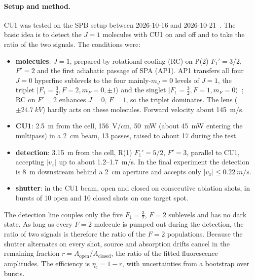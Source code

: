 \documentclass[11pt,a4paper,oneside]{report}
\newcommand{\etac}{\eta_{\mathrm{c}}}
\begin{document}
\paragraph{Setup and method.} CU1 was tested on the SPB setup between 2026-10-16 and
2026-10-21~\cite{CU1GroupMeeting2026}. The basic idea is to detect the $J=1$ molecules with CU1 on
and off and to take the ratio of the two signals. The conditions were:
\begin{itemize}[itemsep=1pt]
  \item \textbf{molecules}: $J=1$, prepared by rotational cooling (RC) on P(2) $F_1'=3/2$, $F'=2$ and
        the first adiabatic passage of SPA (AP1). AP1 transfers all four $J=0$ hyperfine sublevels
        to the four mainly-$m_J=0$ levels of $J=1$, the triplet
        $|F_1=\tfrac32,F=2,m_F=0,\pm1\rangle$ and the singlet
        $|F_1=\tfrac32,F=1,m_F=0\rangle$~\cite{Grasdijk2025AP}; RC on $F'=2$ enhances $J=0$, $F=1$,
        so the triplet dominates. The lens ($\pm\SI{24.7}{kV}$) hardly acts on these molecules.
        Forward velocity about \SI{145}{m/s}.
  \item \textbf{CU1}: \SI{2.5}{m} from the cell, \SI{156}{V/cm}, \SI{50}{mW} (about \SI{45}{mW}
        entering the multipass) in a \SI{2}{cm} beam, 13 passes, raised to about 17 during the test.
  \item \textbf{detection}: \SI{3.15}{m} from the cell, R(1) $F_1'=5/2$, $F'=3$, parallel to CU1,
        accepting $|v_x|$ up to about 1.2--\SI{1.7}{m/s}. In the final experiment the detection is
        \SI{8}{m} downstream behind a \SI{2}{cm} aperture and accepts only
        $|v_x|\leq\SI{0.22}{m/s}$.
  \item \textbf{shutter}: in the CU1 beam, open and closed on consecutive ablation shots, in bursts
        of 10 open and 10 closed shots on one target spot.
\end{itemize}
The detection line couples only the five $F_1=\tfrac32$, $F=2$ sublevels and has no dark state. As
long as every $F=2$ molecule is pumped out during the detection, the ratio of two signals is
therefore the ratio of the $F=2$ populations. Because the shutter alternates on every shot, source
and absorption drifts cancel in the remaining fraction $r=A_{\mathrm{open}}/A_{\mathrm{closed}}$, the
ratio of the fitted fluorescence amplitudes. The efficiency is $\etac=1-r$, with uncertainties from a
bootstrap over bursts.
\end{document}
